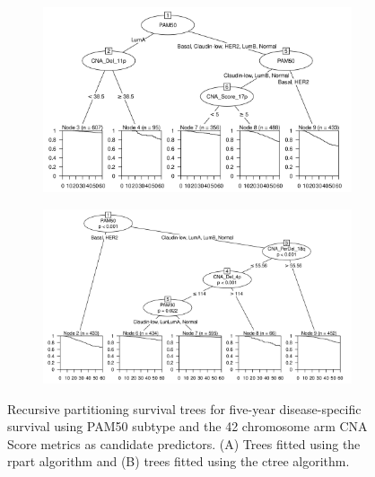 \begin{figure}[!h]
\centering

\vspace{0.5cm}

\begin{subfigure}{\textwidth}
\subcaption{}
\includegraphics[width=1\textwidth]{../figures/Chapter_3/PA_PartyKit_Survival_Score_FiveYearDSS_PAM50.png}
\end{subfigure}

\vspace{2cm}

\begin{subfigure}{\textwidth}
\subcaption{}
\includegraphics[width=1\textwidth]{../figures/Chapter_3/PA_Ctree_Survival_Score_FiveYearDSS_PAM50.png}
\end{subfigure}

\vspace{0.5cm}

\caption[Recursive partitioning survival trees for five-year disease-specific survival using PAM50 subtype and the 42 chromosome arm CNA Score metrics as candidate predictors.]{Recursive partitioning survival trees for five-year disease-specific survival using PAM50 subtype and the 42 chromosome arm CNA Score metrics as candidate predictors. (A) Trees fitted using the rpart algorithm and (B) trees fitted using the ctree algorithm.}
\label{fig:PAM50_PA_CNA_Score_FiveYearDSS}
\end{figure}


